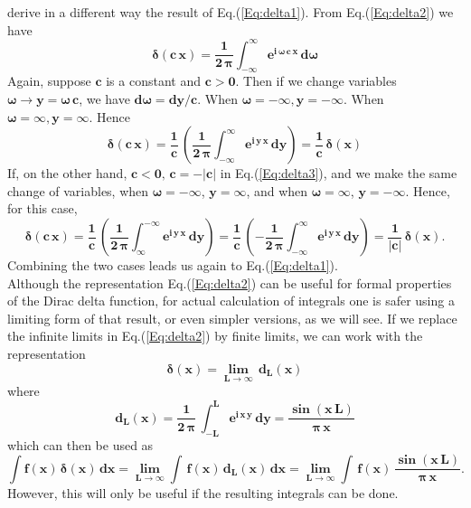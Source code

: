 \documentclass[12pt]{article}
\begin{document}
  derive in a different way the result of Eq.(\ref{Eq:delta1}).
From Eq.(\ref{Eq:delta2}) we have
\begin{equation} \label{Eq:delta3}
\mathbf{\boldsymbol{\delta}(c\,x) = \frac{1}{2\,\boldsymbol{\pi}}	\int_{-\infty}^{\infty} 
              e^{i\,\boldsymbol{\omega}\,c\,x}\, d\boldsymbol{\omega} }
\end{equation}
Again, suppose $\mathbf{c}$ is a constant and $\mathbf{c > 0}$.
Then if we change variables $\mathbf{\boldsymbol{\omega} \rightarrow y = \boldsymbol{\omega}\,c}$,
we have $\mathbf{d\boldsymbol{\omega} = dy/c}$.
When $\mathbf{\boldsymbol{\omega} = -\infty, y = -\infty}$.
When $\mathbf{\boldsymbol{\omega} = \infty, y = \infty}$.
Hence
\begin{equation}
\mathbf{\boldsymbol{\delta}(c\,x) = \frac{1}{c}\,\left( 
             \frac{1}{2\,\boldsymbol{\pi}}	\int_{-\infty}^{\infty} e^{i\,y\,x}\,dy \right) =
			 \frac{1}{c}\,\boldsymbol{\delta}(x) }
\end{equation}
If, on the other hand, $\mathbf{c < 0,\,c = -\vert c \vert}$ in Eq.(\ref{Eq:delta3}), 
  and we make the same change of variables, 
  when $\mathbf{\boldsymbol{\omega} = -\infty}$, $\mathbf{y = \infty}$,
  and when $\mathbf{\boldsymbol{\omega} = \infty}$, $\mathbf{y = -\infty}$.
Hence, for this case,
\begin{equation}
\mathbf{\boldsymbol{\delta}(c\,x) = \frac{1}{c}\,\left( 
             \frac{1}{2\,\boldsymbol{\pi}}	\int_{\infty}^{-\infty} e^{i\,y\,x}\,dy \right) =
			  \frac{1}{c}\,\left( 
			 -\frac{1}{2\,\boldsymbol{\pi}}	\int_{-\infty}^{\infty} e^{i\,y\,x}\,dy \right) =
			 \frac{1}{\vert c \vert }\,\boldsymbol{\delta}(x) }.
\end{equation}
Combining the two cases leads us again to Eq.(\ref{Eq:delta1}).\\

\noindent
Although the representation Eq.(\ref{Eq:delta2}) can be useful for formal properties of
  the Dirac delta function, for actual calculation of integrals one is safer using
  a limiting form of that result, or even simpler versions, as we will see.
If we replace the infinite limits in Eq.(\ref{Eq:delta2}) by finite limits, we can
  work with the representation
\begin{equation}
\mathbf{\boldsymbol{\delta}(x) = \boldsymbol{\lim_{L \rightarrow \infty}} \, d_{L}(x) }
\end{equation}
where
\begin{equation}
\mathbf{d_{L}(x) = \frac{1}{2\,\boldsymbol{\pi}}\, \int_{-L}^{L} e^{i\,x\,y}\,dy =
           \frac{\boldsymbol{\sin}(x\,L)}{\boldsymbol{\pi}\,x} }
\end{equation}
which can then be used as
\begin{equation}
\mathbf{ \int f(x)\,\boldsymbol{\delta}(x) \, dx =
    \boldsymbol{\lim_{L \rightarrow \infty}} \int \,f(x)\,d_{L}(x)\,dx = 
	\boldsymbol{\lim_{L \rightarrow \infty}} \int \,f(x)\, 
	  \frac{\boldsymbol{\sin}(x\,L)}{\boldsymbol{\pi}\,x} }.
\end{equation}
However, this will only be useful if the resulting integrals can be done.\\
\end{document}
